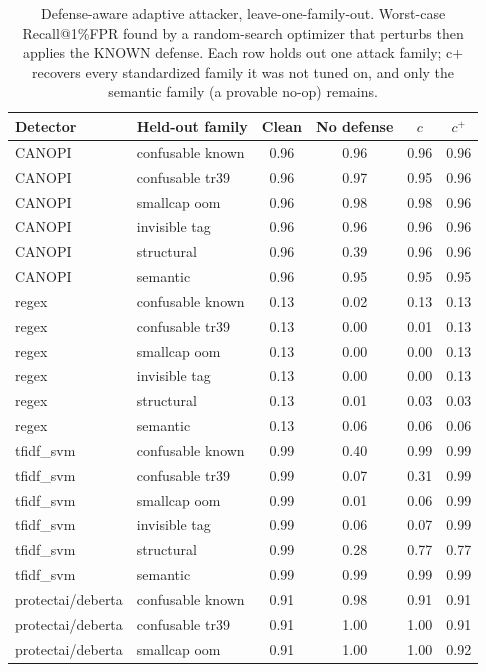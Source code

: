 \begin{table}[ht]\centering
\caption{Defense-aware adaptive attacker, leave-one-family-out. Worst-case Recall@1\%FPR found by a random-search optimizer that perturbs then applies the KNOWN defense. Each row holds out one attack family; c+ recovers every standardized family it was not tuned on, and only the semantic family (a provable no-op) remains.}
\label{tab:adaptive_v2}
\small
\begin{tabular}{ll cccc}
\toprule
Detector & Held-out family & Clean & No defense & $c$ & $c^{+}$ \\
\midrule
CANOPI & confusable known & 0.96 & 0.96 & 0.96 & 0.96 \\
CANOPI & confusable tr39 & 0.96 & 0.97 & 0.95 & 0.96 \\
CANOPI & smallcap oom & 0.96 & 0.98 & 0.98 & 0.96 \\
CANOPI & invisible tag & 0.96 & 0.96 & 0.96 & 0.96 \\
CANOPI & structural & 0.96 & 0.39 & 0.96 & 0.96 \\
CANOPI & semantic & 0.96 & 0.95 & 0.95 & 0.95 \\
regex & confusable known & 0.13 & 0.02 & 0.13 & 0.13 \\
regex & confusable tr39 & 0.13 & 0.00 & 0.01 & 0.13 \\
regex & smallcap oom & 0.13 & 0.00 & 0.00 & 0.13 \\
regex & invisible tag & 0.13 & 0.00 & 0.00 & 0.13 \\
regex & structural & 0.13 & 0.01 & 0.03 & 0.03 \\
regex & semantic & 0.13 & 0.06 & 0.06 & 0.06 \\
tfidf_svm & confusable known & 0.99 & 0.40 & 0.99 & 0.99 \\
tfidf_svm & confusable tr39 & 0.99 & 0.07 & 0.31 & 0.99 \\
tfidf_svm & smallcap oom & 0.99 & 0.01 & 0.06 & 0.99 \\
tfidf_svm & invisible tag & 0.99 & 0.06 & 0.07 & 0.99 \\
tfidf_svm & structural & 0.99 & 0.28 & 0.77 & 0.77 \\
tfidf_svm & semantic & 0.99 & 0.99 & 0.99 & 0.99 \\
protectai/deberta & confusable known & 0.91 & 0.98 & 0.91 & 0.91 \\
protectai/deberta & confusable tr39 & 0.91 & 1.00 & 1.00 & 0.91 \\
protectai/deberta & smallcap oom & 0.91 & 1.00 & 1.00 & 0.92 \\

\end{tabular}
\end{table}
